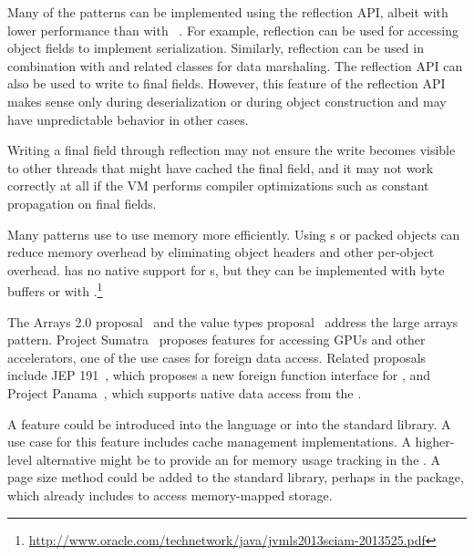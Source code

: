 
Many of the patterns can be implemented using the reflection API,
albeit with lower performance than with \unsafe{}~\citep{korlandNoninvasiveConcurrencyJava2010}.
For example,
reflection can be used for accessing object fields to implement serialization.
Similarly, reflection can be used
in combination with
 and related classes for
data marshaling.
The reflection API can also be used to write to final fields.
However, this feature of the reflection API 
makes sense only during deserialization or during object construction and may have
unpredictable behavior in other cases.


Writing a final field through reflection may not ensure
the write becomes visible to other threads that might have cached the final
field, and it may not work correctly at all if the VM performs compiler
optimizations such as constant propagation on final fields.

Many patterns use \unsafe{} to use memory more efficiently.
Using s or packed objects can reduce memory overhead by eliminating object headers and other per-object overhead.
\java{} has no native support for s,
but they can be implemented with byte buffers or with \jni{}.\footnote{\url{http://www.oracle.com/technetwork/java/jvmls2013sciam-2013525.pdf}}

The Arrays 2.0 proposal~\citep{arrays20} and
the value types proposal~\citep{valuetypes} address the large arrays pattern.
Project Sumatra~\citep{layouts} proposes features for accessing GPUs
and other accelerators,
one of the use cases for foreign data access.
Related proposals include JEP 191~\citep{jep191},
which proposes a new foreign function interface for \java{},
and Project Panama~\citep{panama}, which supports native data access from the \jvm{}.

A  feature could be introduced into the language or into the standard library.
A use case for this feature includes cache management implementations.
A higher-level alternative might be to provide an \api{} for memory usage tracking in the \jvm{}.
A page size method could be added to the standard library,
perhaps in the  package,
which already includes  to access memory-mapped storage.

